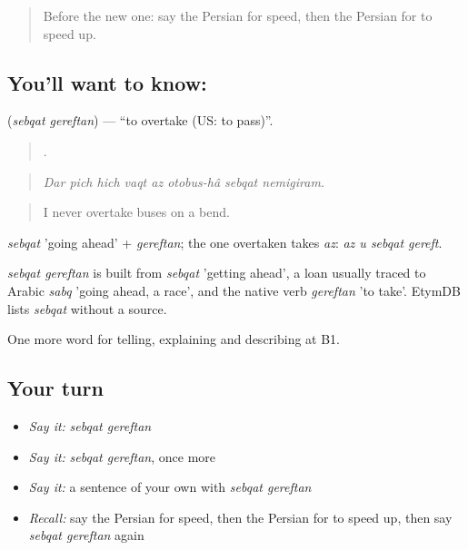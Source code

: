 \label{lesson:FA-C424-sebqat-gereftan}



\begin{quote}
Before the new one: say the Persian for speed, then the Persian for to speed up.
\end{quote}

\subsection*{You'll want to know:  }
\textbf{ } (\emph{sebqat gereftan}) — \textquotedblleft{}to overtake (US: to pass)\textquotedblright{}.

\begin{quote}
       .
\end{quote}

\begin{quote}
\emph{Dar pich hich vaqt az otobus-hâ sebqat nemigiram.}
\end{quote}

\begin{quote}
I never overtake buses on a bend.
\end{quote}

\emph{sebqat} 'going ahead' + \emph{gereftan}; the one overtaken takes \emph{az}: \emph{az u sebqat gereft}.

\begin{cousinweb}
\emph{sebqat gereftan} is built from \emph{sebqat} 'getting ahead', a loan usually traced to Arabic \emph{sabq} 'going ahead, a race', and the native verb \emph{gereftan} 'to take'. EtymDB lists \emph{sebqat} without a source.
\end{cousinweb}

\begin{grammarlens}[title={What you've built}]
One more word for telling, explaining and describing at B1.
\end{grammarlens}

\subsection*{Your turn}
\begin{itemize}
\raggedright
  \item \emph{Say it:} \emph{sebqat gereftan}
  \item \emph{Say it:} \emph{sebqat gereftan}, once more
  \item \emph{Say it:} a sentence of your own with \emph{sebqat gereftan}
  \item \emph{Recall:} say the Persian for speed, then the Persian for to speed up, then say \emph{sebqat gereftan} again
\end{itemize}

